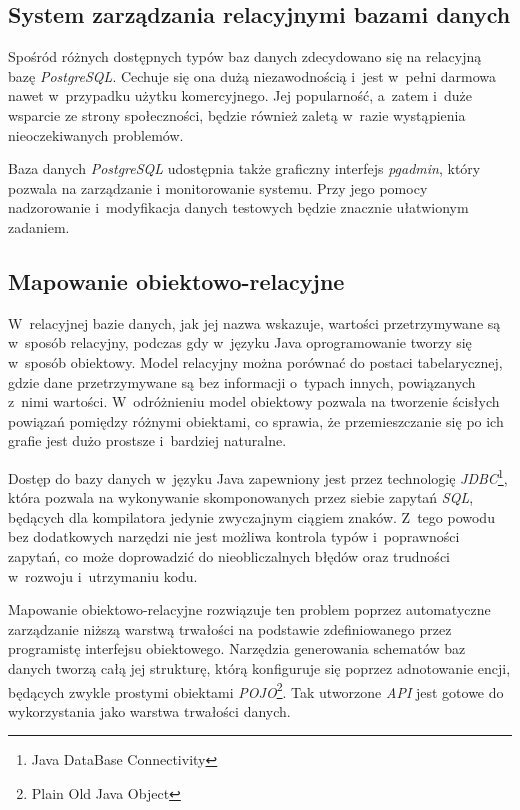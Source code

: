 \documentclass[11pt]{aghdpl}
\begin{document}
\subsection{System zarządzania relacyjnymi bazami danych}

Spośród różnych dostępnych typów baz danych zdecydowano się na relacyjną bazę \emph{PostgreSQL}. Cechuje się ona dużą niezawodnością i~jest w~pełni darmowa nawet w~przypadku użytku komercyjnego. Jej popularność, a~zatem i~duże wsparcie ze strony społeczności, będzie również zaletą w~razie wystąpienia nieoczekiwanych problemów.

Baza danych \emph{PostgreSQL} udostępnia także graficzny interfejs \emph{pgadmin}, który pozwala na zarządzanie i monitorowanie systemu. Przy jego pomocy nadzorowanie i~modyfikacja danych testowych będzie znacznie ułatwionym zadaniem.

\subsection{Mapowanie obiektowo-relacyjne}

W~relacyjnej bazie danych, jak jej nazwa wskazuje, wartości przetrzymywane są w~sposób relacyjny, podczas gdy w~języku Java oprogramowanie tworzy się w~sposób obiektowy. Model relacyjny można porównać do postaci tabelarycznej, gdzie dane przetrzymywane są bez informacji o~typach innych, powiązanych z~nimi wartości. W~odróżnieniu model obiektowy pozwala na tworzenie ścisłych powiązań pomiędzy różnymi obiektami, co sprawia, że przemieszczanie się po ich grafie jest dużo prostsze i~bardziej naturalne.

Dostęp do bazy danych w~języku Java zapewniony jest przez technologię \emph{JDBC}\footnote{Java DataBase Connectivity}, która pozwala na wykonywanie skomponowanych przez siebie zapytań \emph{SQL}, będących dla kompilatora jedynie zwyczajnym ciągiem znaków. Z~tego powodu bez dodatkowych narzędzi nie jest możliwa kontrola typów i~poprawności zapytań, co może doprowadzić do nieobliczalnych błędów oraz trudności w~rozwoju i~utrzymaniu kodu.

Mapowanie obiektowo-relacyjne rozwiązuje ten problem poprzez automatyczne zarządzanie niższą warstwą trwałości na podstawie zdefiniowanego przez programistę interfejsu obiektowego. Narzędzia generowania schematów baz danych tworzą całą jej strukturę, którą konfiguruje się poprzez adnotowanie encji, będących zwykle prostymi obiektami \emph{POJO}\footnote{Plain Old Java Object}. Tak utworzone \emph{API} jest gotowe do wykorzystania jako warstwa trwałości danych.
\end{document}
